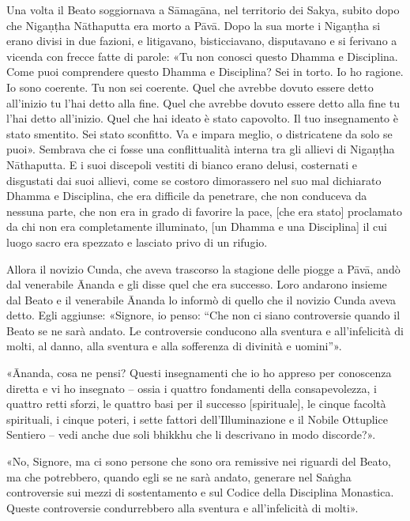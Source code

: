 Una volta il Beato soggiornava a Sāmagāna, nel territorio dei Sakya, subito dopo
che Nigaṇṭha Nāthaputta era morto a Pāvā. Dopo la sua morte i Nigaṇṭha si erano
divisi in due fazioni, e litigavano, bisticciavano, disputavano e si ferivano a
vicenda con frecce fatte di parole: «Tu non conosci questo Dhamma e Disciplina.
Come puoi comprendere questo Dhamma e Disciplina? Sei in torto. Io ho ragione.
Io sono coerente. Tu non sei coerente. Quel che avrebbe dovuto essere detto
all’inizio tu l’hai detto alla fine. Quel che avrebbe dovuto essere detto alla
fine tu l’hai detto all’inizio. Quel che hai ideato è stato capovolto. Il tuo
insegnamento è stato smentito. Sei stato sconfitto. Va e impara meglio, o
districatene da solo se puoi». Sembrava che ci fosse una conflittualità interna
tra gli allievi di Nigaṇṭha Nāthaputta. E i suoi discepoli vestiti di bianco
erano delusi, costernati e disgustati dai suoi allievi, come se costoro
dimorassero nel suo mal dichiarato Dhamma e Disciplina, che era difficile da
penetrare, che non conduceva da nessuna parte, che non era in grado di favorire
la pace, [che era stato] proclamato da chi non era completamente illuminato, [un
Dhamma e una Disciplina] il cui luogo sacro era spezzato e lasciato privo di un
rifugio.

Allora il novizio Cunda, che aveva trascorso la stagione delle piogge a Pāvā,
andò dal venerabile Ānanda e gli disse quel che era successo. Loro andarono
insieme dal Beato e il venerabile Ānanda lo informò di quello che il novizio
Cunda aveva detto. Egli aggiunse: «Signore, io penso: “Che non ci siano
controversie quando il Beato se ne sarà andato. Le controversie conducono alla
sventura e all’infelicità di molti, al danno, alla sventura e alla sofferenza di
divinità e uomini”».

«Ānanda, cosa ne pensi? Questi insegnamenti che io ho appreso per conoscenza
diretta e vi ho insegnato – ossia i quattro fondamenti della consapevolezza, i
quattro retti sforzi, le quattro basi per il successo [spirituale], le cinque
facoltà spirituali, i cinque poteri, i sette fattori dell’Illuminazione e il
Nobile Ottuplice Sentiero – vedi anche due soli bhikkhu che li descrivano in
modo discorde?».

«No, Signore, ma ci sono persone che sono ora remissive nei riguardi del Beato,
ma che potrebbero, quando egli se ne sarà andato, generare nel Saṅgha
controversie sui mezzi di sostentamento e sul Codice della Disciplina Monastica.
Queste controversie condurrebbero alla sventura e all’infelicità di molti».

